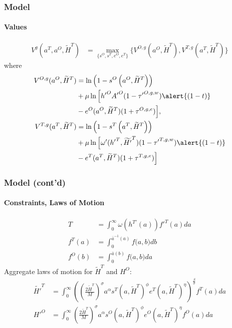 \documentclass[11pt]{beamer}
\begin{document}
\begin{frame}
\frametitle{Model}
\framesubtitle{Values}
\begin{align*}
V^g(a^T,a^O,\widetilde{H}^T) & = \max_{\{s^{O},s^{T},e^{O},e^{T}\}} \bigg\{ V^{O,g}(a^O,\widetilde{H}^T), V^{T,g}(a^T,\widetilde{H}^T) \bigg\}
\end{align*}
where
\begin{align*}
V^{O,g}(a^O,\widetilde{H}^T) & = \ln\left(1-s^O\left(a^O,\widetilde{H}^T\right)\right) \\
& + \mu \ln \Big[ {{h'}^{O}} {A'}^O(1-{{\tau'}^{O,g,w}})\alert{(1-t)} \\
& - e^O(a^O,\widetilde{H}^T)(1+\tau^{O,g,e}) \Big],  \\
V^{T,g}(a^T,\widetilde{H}^T) & = \ln\left(1-s^T\left(a^T,\widetilde{H}^T\right)\right)  \\
& + \mu \ln \Big[ \omega'({{h'}^{T}},{\widetilde{H'}^{T}})(1-{{\tau'}^{T,g,w}})\alert{(1-t)}  \\
& - e^T(a^T,\widetilde{H}^T)(1+\tau^{T,g,e}) \Big] 
\end{align*}
\end{frame}

\begin{frame}
\frametitle{Model (cont'd)}
\framesubtitle{Constraints, Laws of Motion}
\begin{align}
T & = \int_0^\infty \omega\left(h^{T'}(a)\right) {f'}^T(a) da \nonumber\\%
f^T(a) & = \int_0^{\bar{a}^{-1}\left(a\right)} f\big(a,b \big) db \nonumber\\
f^O(b) & = \int_0^{\bar{a}\left(b\right)} f\big(a,b \big) da \nonumber
\end{align}
Aggregate laws of motion for $\widetilde{H}^T$ and ${H}^O$:
\begin{align}
\widetilde{H'}^{T} & = \int_0^\infty \left(\left(\tfrac{2 \widetilde{H}^T}{M}\right)^\sigma a^\alpha s^T\left(a,\widetilde{H}^T\right)^\phi e^T(a,\widetilde{H}^T)^\eta \right)^{\frac{\beta}{\sigma}} f^T(a) da \nonumber \\
{H'}^{O} & = \int_0^\infty \left(\tfrac{2 \widetilde{H}^T}{M}\right)^\sigma a^\alpha s^O\left(a,\widetilde{H}^T\right)^\phi e^O(a,\widetilde{H}^T)^\eta  f^O(a) da \nonumber
\end{align}
\end{frame}
\end{document}
